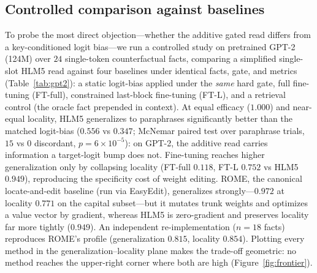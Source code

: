 \documentclass[10pt,twocolumn]{article}
\theoremstyle{remark}
\begin{document}
\subsection{Controlled comparison against baselines}
\label{sec:controlled}

To probe the most direct objection---whether the additive gated read differs from
a key-conditioned logit bias---we run a controlled study on pretrained GPT-2
(124M) over $24$ single-token counterfactual facts, comparing a simplified
single-slot HLM5 read against four baselines under identical facts, gate, and
metrics (Table~\ref{tab:gpt2}): a static logit-bias applied under the \emph{same}
hard gate, full fine-tuning (FT-full), constrained last-block fine-tuning (FT-L),
and a retrieval control (the oracle fact prepended in context). At equal efficacy ($1.000$) and near-equal locality,
HLM5 generalizes to paraphrases significantly better than the matched logit-bias
($0.556$ vs $0.347$; McNemar paired test over paraphrase trials, $15$ vs $0$
discordant, $p=6\times10^{-5}$): on GPT-2, the additive read carries information a
target-logit bump does not. Fine-tuning reaches higher generalization only by
collapsing locality (FT-full $0.118$, FT-L $0.752$ vs HLM5 $0.949$), reproducing
the specificity cost of weight editing. ROME, the canonical locate-and-edit
baseline (run via EasyEdit), generalizes strongly---$0.972$ at locality $0.771$ on
the capital subset---but it mutates trunk weights and optimizes a value vector by
gradient, whereas HLM5 is zero-gradient and preserves locality far more tightly
($0.949$). An independent re-implementation ($n=18$ facts) reproduces ROME's
profile (generalization $0.815$, locality $0.854$). Plotting every method in the
generalization--locality plane makes the trade-off geometric: no method reaches
the upper-right corner where both are high (Figure~\ref{fig:frontier}).
\end{document}
